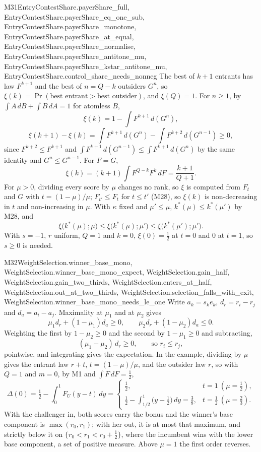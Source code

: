 \begin{mproof}{M31}{EntryContestShare.payerShare_full, EntryContestShare.payerShare_eq_one_sub, EntryContestShare.payerShare_monotone, EntryContestShare.payerShare_at_equal, EntryContestShare.payerShare_normalise, EntryContestShare.payerShare_antitone_mu, EntryContestShare.payerShare_kstar_antitone_mu, EntryContestShare.control_share_needs_nonneg}
The best of $k+1$ entrants has law $F^{k+1}$ and the best of $n=Q-k$ outsiders
$G^{n}$, so $\xi(k)=\Pr(\text{best entrant}>\text{best outsider})$, and $\xi(Q)=1$.
For $n\ge1$, by $\int A\,dB+\int B\,dA=1$ for atomless $B$,
\[
  \xi(k)=1-\int F^{k+1}\,d(G^{n}),
\]
\[
  \xi(k+1)-\xi(k)=\int F^{k+1}\,d(G^{n})-\int F^{k+2}\,d(G^{n-1})\ge0,
\]
since $F^{k+2}\le F^{k+1}$ and $\int F^{k+1}\,d(G^{n-1})\le\int F^{k+1}\,d(G^{n})$
by the same identity and $G^{n}\le G^{n-1}$. For $F=G$,
\[
  \xi(k)=(k+1)\int F^{Q-k}F^{k}\,dF=\frac{k+1}{Q+1}.
\]
For $\mu>0$, dividing every score by $\mu$ changes no rank, so $\xi$ is
computed from $F_t$ and $G$ with $t=(1-\mu)/\mu$; $F_{t'}\le F_t$ for
$t\le t'$ (M28), so $\xi(k)$ is non-decreasing in $t$ and non-increasing in
$\mu$. With $\kappa$ fixed and $\mu'\le\mu$, $k^*(\mu)\le k^*(\mu')$ by M28, and
\[
  \xi\big(k^*(\mu);\mu\big)\le \xi\big(k^*(\mu);\mu'\big)\le \xi\big(k^*(\mu');\mu'\big).
\]
With $s=-1$, $r$ uniform, $Q=1$ and $k=0$, $\xi(0)=\frac12$ at $t=0$ and $0$ at
$t=1$, so $s\ge0$ is needed.
\end{mproof}


\begin{mproof}{M32}{WeightSelection.winner_base_mono, WeightSelection.winner_base_mono_expect, WeightSelection.gain_half, WeightSelection.gain_two_thirds, WeightSelection.enters_at_half, WeightSelection.out_at_two_thirds, WeightSelection.selection_falls_with_exit, WeightSelection.winner_base_mono_needs_le_one}
Write $a_k=s_ke_k$, $d_r=r_i-r_j$ and $d_a=a_i-a_j$. Maximality at $\mu_1$
and at $\mu_2$ gives
\[
  \mu_1d_r+(1-\mu_1)d_a\ge0,\qquad \mu_2d_r+(1-\mu_2)d_a\le0 .
\]
Weighting the first by $1-\mu_2\ge0$ and the second by $1-\mu_1\ge0$ and
subtracting,
\[
  (\mu_1-\mu_2)\,d_r\ge0,\qquad\text{so } r_i\le r_j ,
\]
pointwise, and integrating gives the expectation. In the example, dividing by
$\mu$ gives the entrant law $r+t$, $t=(1-\mu)/\mu$, and the outsider law $r$,
so with $Q=1$ and $m=0$, by M1 and $\int F\,dF=\frac12$,
\[
  \Delta(0)=\tfrac12-\int_0^1 F_U(y-t)\,dy=
  \begin{cases}\tfrac12, & t=1\ (\mu=\tfrac12),\\[2pt]
  \tfrac12-\int_{1/2}^{1}\big(y-\tfrac12\big)\,dy=\tfrac38, & t=\tfrac12\ (\mu=\tfrac23).\end{cases}
\]
With the challenger in, both scores carry the bonus and the winner's base
component is $\max(r_0,r_1)$; with her out, it is at most that maximum, and
strictly below it on $\{r_0<r_1<r_0+\tfrac12\}$, where the incumbent wins with
the lower base component, a set of positive measure. Above $\mu=1$ the first
order reverses.
\end{mproof}

